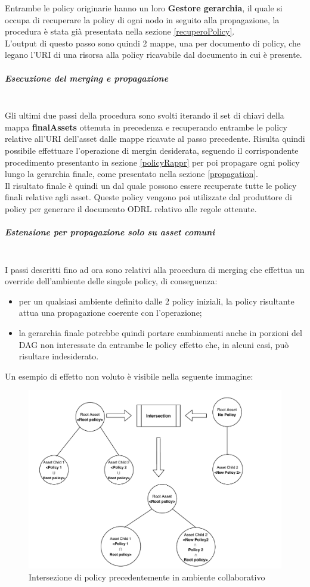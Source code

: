 \documentclass[12pt,a4paper,twoside]{book}
\begin{document}
Entrambe le policy originarie hanno un loro \textbf{Gestore gerarchia}, il quale si occupa di recuperare la policy di ogni nodo in seguito alla propagazione, la procedura è stata già presentata nella sezione \ref{recuperoPolicy}.\\
L'output di questo passo sono quindi 2 mappe, una per documento di policy, che legano l'URI di una risorsa alla policy ricavabile dal documento in cui è presente. 
\subparagraph{Esecuzione del merging e propagazione}\mbox{}\\
Gli ultimi due passi della procedura sono svolti iterando il set di chiavi della mappa \textbf{finalAssets} ottenuta in precedenza e recuperando entrambe le policy relative all'URI dell'asset dalle mappe ricavate al passo precedente. Risulta quindi possibile effettuare l'operazione di mergin desiderata, seguendo il corrispondente procedimento presentanto in sezione \ref{policyRappr} per poi propagare ogni policy lungo la gerarchia finale, come presentato nella sezione \ref{propagation}.\\
Il risultato finale è quindi un  dal quale possono essere recuperate tutte le policy finali relative agli asset. Queste policy vengono poi utilizzate dal produttore di policy per generare il documento ODRL relativo alle regole ottenute.
\subparagraph{Estensione per propagazione solo su asset comuni}\mbox{}\\
I passi descritti fino ad ora sono relativi alla procedura di merging che effettua un override dell'ambiente delle singole policy, di conseguenza:
\begin{itemize}
\item per un qualsiasi ambiente definito dalle 2 policy iniziali, la policy risultante attua una propagazione coerente con l'operazione;
\item la gerarchia finale potrebbe quindi portare cambiamenti anche in porzioni del DAG non interessate da entrambe le policy effetto che, in alcuni casi, può risultare indesiderato.
\end{itemize}
Un esempio di effetto non voluto è visibile nella seguente immagine:
\begin{figure}[H]
\centering
\includegraphics[scale=.60]{../immagini/wrongProp.pdf}
\caption{Intersezione di policy precedentemente in ambiente collaborativo}
\label{wrongProp}
\end{figure}
\end{document}
